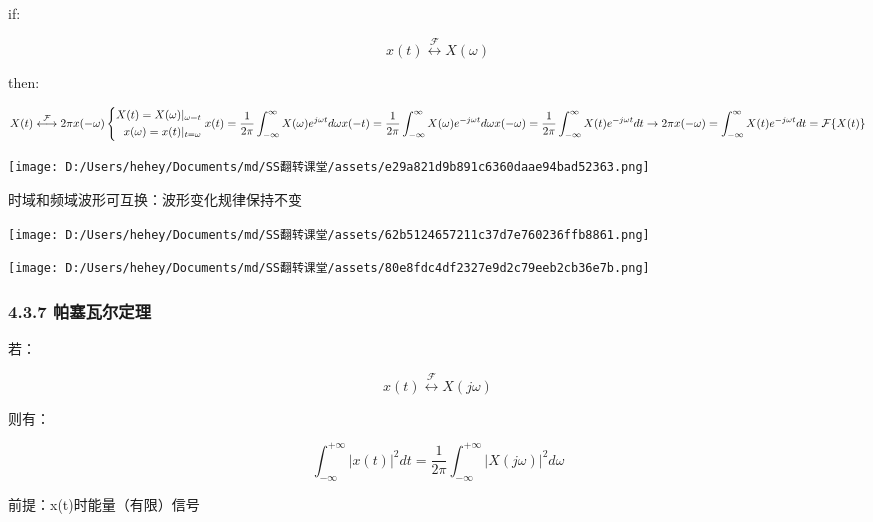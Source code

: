 \documentclass[
]{article}
\begin{document}
if:

\[x(t)\stackrel{\mathcal{F}}{\longleftrightarrow}X(\omega)\]

then:

\[X(t)\stackrel{\mathcal{F}}{\longleftrightarrow}2\pi x(-\omega)\\

\left\{

\begin{aligned}

    X(t)=X(\omega)|_{\omega = t}\\

    x(\omega)=x(t)|_{t=\omega}

\end{aligned}

\right.\\

x(t)=\frac{1}{2\pi}\int_{-\infty}^{\infty}X(\omega)e^{j\omega t}d\omega\\

x(-t)=\frac{1}{2\pi}\int_{-\infty}^{\infty}X(\omega)e^{-j\omega t}d\omega\\

x(-\omega)=\frac{1}{2\pi}\int_{-\infty}^{\infty}X(t)e^{-j\omega t}dt\\

\to 2\pi x(-\omega)=\int_{-\infty}^{\infty}X(t)e^{-j\omega t}dt = \mathcal F\{X(t)\}\]

\texttt{[image: D:/Users/hehey/Documents/md/SS翻转课堂/assets/e29a821d9b891c6360daae94bad52363.png]}

时域和频域波形可互换：波形变化规律保持不变

\texttt{[image: D:/Users/hehey/Documents/md/SS翻转课堂/assets/62b5124657211c37d7e760236ffb8861.png]}

\texttt{[image: D:/Users/hehey/Documents/md/SS翻转课堂/assets/80e8fdc4df2327e9d2c79eeb2cb36e7b.png]}

\subsubsection{4.3.7
帕塞瓦尔定理}\label{437-ux5e15ux585eux74e6ux5c14ux5b9aux7406}

若：

\[x(t)\stackrel{\mathcal{F}}{\longleftrightarrow}X(j\omega)\]

则有：

\[\int_{-\infty}^{+\infty}|x(t)|^2dt=\frac{1}{2\pi}\int_{-\infty}^{+\infty}|X(j\omega)|^2d\omega\]

前提：x(t)时能量（有限）信号
\end{document}
